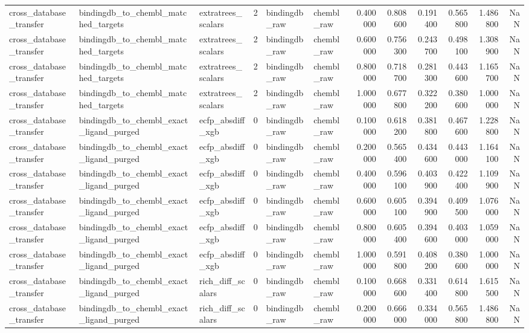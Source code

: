 \begin{longtable}{lllrllrrrrrr}
cross\_database\_transfer & bindingdb\_to\_chembl\_matched\_targets & extratrees\_scalars & 2 & bindingdb\_raw & chembl\_raw & 0.400000 & 0.808600 & 0.191400 & 0.565800 & 1.486800 & NaN \\
cross\_database\_transfer & bindingdb\_to\_chembl\_matched\_targets & extratrees\_scalars & 2 & bindingdb\_raw & chembl\_raw & 0.600000 & 0.756300 & 0.243700 & 0.498100 & 1.308900 & NaN \\
cross\_database\_transfer & bindingdb\_to\_chembl\_matched\_targets & extratrees\_scalars & 2 & bindingdb\_raw & chembl\_raw & 0.800000 & 0.718700 & 0.281300 & 0.443600 & 1.165700 & NaN \\
cross\_database\_transfer & bindingdb\_to\_chembl\_matched\_targets & extratrees\_scalars & 2 & bindingdb\_raw & chembl\_raw & 1.000000 & 0.677800 & 0.322200 & 0.380600 & 1.000000 & NaN \\
cross\_database\_transfer & bindingdb\_to\_chembl\_exact\_ligand\_purged & ecfp\_absdiff\_xgb & 0 & bindingdb\_raw & chembl\_raw & 0.100000 & 0.618200 & 0.381800 & 0.467600 & 1.228800 & NaN \\
cross\_database\_transfer & bindingdb\_to\_chembl\_exact\_ligand\_purged & ecfp\_absdiff\_xgb & 0 & bindingdb\_raw & chembl\_raw & 0.200000 & 0.565400 & 0.434600 & 0.443000 & 1.164100 & NaN \\
cross\_database\_transfer & bindingdb\_to\_chembl\_exact\_ligand\_purged & ecfp\_absdiff\_xgb & 0 & bindingdb\_raw & chembl\_raw & 0.400000 & 0.596100 & 0.403900 & 0.422400 & 1.109900 & NaN \\
cross\_database\_transfer & bindingdb\_to\_chembl\_exact\_ligand\_purged & ecfp\_absdiff\_xgb & 0 & bindingdb\_raw & chembl\_raw & 0.600000 & 0.605100 & 0.394900 & 0.409500 & 1.076000 & NaN \\
cross\_database\_transfer & bindingdb\_to\_chembl\_exact\_ligand\_purged & ecfp\_absdiff\_xgb & 0 & bindingdb\_raw & chembl\_raw & 0.800000 & 0.605400 & 0.394600 & 0.403000 & 1.059000 & NaN \\
cross\_database\_transfer & bindingdb\_to\_chembl\_exact\_ligand\_purged & ecfp\_absdiff\_xgb & 0 & bindingdb\_raw & chembl\_raw & 1.000000 & 0.591800 & 0.408200 & 0.380600 & 1.000000 & NaN \\
cross\_database\_transfer & bindingdb\_to\_chembl\_exact\_ligand\_purged & rich\_diff\_scalars & 0 & bindingdb\_raw & chembl\_raw & 0.100000 & 0.668600 & 0.331400 & 0.614800 & 1.615500 & NaN \\
cross\_database\_transfer & bindingdb\_to\_chembl\_exact\_ligand\_purged & rich\_diff\_scalars & 0 & bindingdb\_raw & chembl\_raw & 0.200000 & 0.666000 & 0.334000 & 0.565800 & 1.486800 & NaN \\

\end{longtable}
